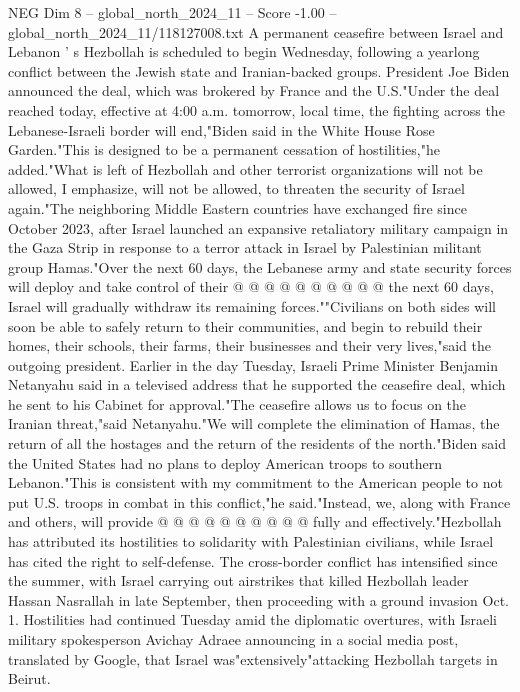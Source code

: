 \begin{textsample}{NEG Dim 8 – global\_north\_2024\_11 – Score -1.00 – global\_north\_2024\_11/118127008.txt}  \label{ex:f8_neg_391}
A permanent ceasefire between Israel and Lebanon ' s Hezbollah is scheduled to begin Wednesday, following a yearlong conflict between the Jewish state and Iranian-backed groups.
President Joe Biden announced the deal, which was brokered by France and the U.S."Under the deal reached today, effective at 4:00 a.m. tomorrow, local time, the fighting across the Lebanese-Israeli border will end,"Biden said in the White House Rose Garden."This is designed to be a permanent cessation of hostilities,"he added."What is left of Hezbollah and other terrorist organizations will not be allowed, I emphasize, will not be allowed, to threaten the security of Israel again."The neighboring Middle Eastern countries have exchanged fire since October 2023, after Israel launched an expansive retaliatory military campaign in the Gaza Strip in response to a terror attack in Israel by Palestinian militant group Hamas."Over the next 60 days, the Lebanese army and state security forces will deploy and take control of their @ @ @ @ @ @ @ @ @ @ the next 60 days, Israel will gradually withdraw its remaining forces.""Civilians on both sides will soon be able to safely return to their communities, and begin to rebuild their homes, their schools, their farms, their businesses and their very lives,"said the outgoing president.
Earlier in the day Tuesday, Israeli Prime Minister Benjamin Netanyahu said in a televised address that he supported the ceasefire deal, which he sent to his Cabinet for approval."The ceasefire allows us to focus on the Iranian threat,"said Netanyahu."We will complete the elimination of Hamas, the return of all the hostages and the return of the residents of the north."Biden said the United States had no plans to deploy American troops to southern Lebanon."This is consistent with my commitment to the American people to not put U.S. troops in combat in this conflict,"he said."Instead, we, along with France and others, will provide @ @ @ @ @ @ @ @ @ @ fully and effectively."Hezbollah has attributed its hostilities to solidarity with Palestinian civilians, while Israel has cited the right to self-defense.
The cross-border conflict has intensified since the summer, with Israel carrying out airstrikes that killed Hezbollah leader Hassan Nasrallah in late September, then proceeding with a ground invasion Oct. 1.
Hostilities had continued Tuesday amid the diplomatic overtures, with Israeli military spokesperson Avichay Adraee announcing in a social media post, translated by Google, that Israel was"extensively"attacking Hezbollah targets in Beirut.

\end{textsample}
